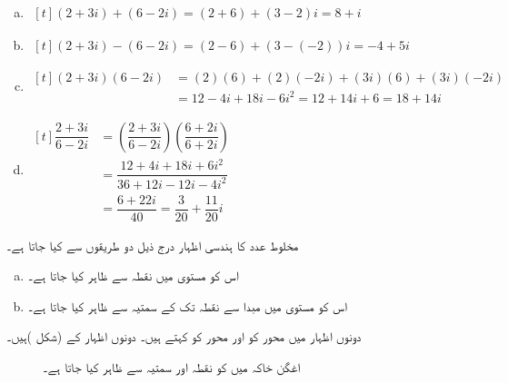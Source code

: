 \begin{enumerate}[a.]
\item\hfill$\begin{aligned}[t]
(2+3i)+(6-2i)=(2+6)+(3-2)i=8+i
\end{aligned}$\hfill\mbox{}
\item\hfill$\begin{aligned}[t]
(2+3i)-(6-2i)=(2-6)+(3-(-2))i=-4+5i
\end{aligned}$\hfill\mbox{}
\item\hfill$\begin{aligned}[t]
(2+3i)(6-2i)&=(2)(6)+(2)(-2i)+(3i)(6)+(3i)(-2i)\\
&=12-4i+18i-6i^2=12+14i+6=18+14i
\end{aligned}$\hfill\mbox{}

\item\hfill$\begin{aligned}[t]
\dfrac{2+3i}{6-2i}&=\left(\dfrac{2+3i}{6-2i}\right)\left(\dfrac{6+2i}{6+2i}\right)\\
&=\dfrac{12+4i+18i+6i^2}{36+12i-12i-4i^2}\\
&=\dfrac{6+22i}{40}=\dfrac{3}{20}+\dfrac{11}{20}i
\end{aligned}$\hfill\mbox{}
\end{enumerate}


مخلوط عدد    کا ہندسی اظہار  درج ذیل  دو طریقوں سے کیا جاتا ہے۔
\begin{enumerate}[a.]
\item
اس کو  مستوی  میں  نقطہ   سے ظاہر کیا جاتا ہے۔
\item
اس کو مستوی   میں مبدا سے نقطہ  تک  کے سمتیہ سے ظاہر کیا جاتا ہے۔
\end{enumerate}
دونوں اظہار میں محور  کو   اور 
 محور  کو      کہتے ہیں۔ دونوں اظہار  کے (شکل )ہیں۔

\begin{figure}
\centering
{}
\caption{
اغگن خاکہ میں  کو  نقطہ  اور سمتیہ  سے    ظاہر کیا جاتا ہے۔
}
\label{شکل_ضمیمہ_تین_دو}
\end{figure}

